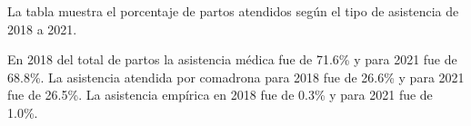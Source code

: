 La tabla muestra el porcentaje de partos atendidos según el tipo de asistencia de 2018 a 2021. 

En 2018 del total de partos la asistencia médica fue de 71.6\% y para 2021 fue de 68.8\%. La asistencia atendida por comadrona para 2018 fue de 26.6\% y para 2021 fue de 26.5\%. La asistencia empírica en 2018 fue de 0.3\%  y para 2021 fue de 1.0\%. 